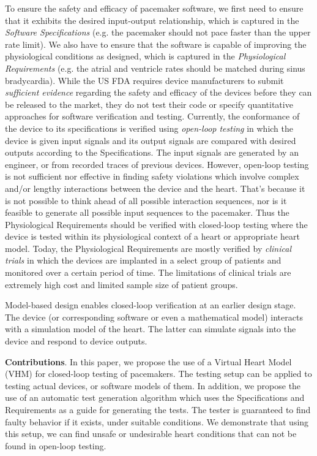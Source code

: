 To ensure the safety and efficacy of pacemaker software, we first need to ensure that it exhibits the desired input-output relationship, which is captured in the \emph{Software Specifications} (e.g. the pacemaker should not pace faster than the upper rate limit). 
We also have to ensure that the software is capable of improving the physiological conditions as designed, which is captured in the \emph{Physiological Requirements} (e.g. the atrial and ventricle rates should be matched during sinus bradycardia). 
While the US FDA requires device manufacturers to submit \emph{sufficient evidence} regarding the safety and efficacy of the devices before they can be released to the market, they do not test their code or specify quantitative approaches for software verification and testing. 
Currently, the conformance of the device to its specifications is verified using \emph{open-loop testing} in which the device is given input signals and its output signals are compared with desired outputs according to the Specifications. 
The input signals are generated by an engineer, or from recorded traces of previous devices.
However, open-loop testing is not sufficient nor effective in finding safety violations which involve complex and/or lengthy interactions between the device and the heart.
That's because it is not possible to think ahead of all possible interaction sequences, nor is it feasible to generate all possible input sequences to the pacemaker.
Thus the Physiological Requirements should be verified with closed-loop testing where the device is tested within its physiological context of a heart or appropriate heart model. 
Today, the Physiological Requirements are mostly verified by \emph{clinical trials} in which the devices are implanted in a select group of patients and monitored over a certain period of time. 
The limitations of clinical trials are extremely high cost and limited sample size of patient groups.

Model-based design enables closed-loop verification at an earlier design stage. 
The device (or corresponding software or even a mathematical model) interacts with a simulation model of the heart.
The latter can simulate signals into the device and respond to device outputs. 

\textbf{Contributions}. 
In this paper, we propose the use of a Virtual Heart Model (VHM) for closed-loop testing of pacemakers.
The testing setup can be applied to testing actual devices, or software models of them.
In addition, we propose the use of an automatic test generation algorithm which uses the Specifications and Requirements as a guide for generating the tests.
The tester is guaranteed to find faulty behavior if it exists, under suitable conditions. 
We demonstrate that using this setup, we can find unsafe or undesirable heart conditions that can not be found in open-loop testing.

